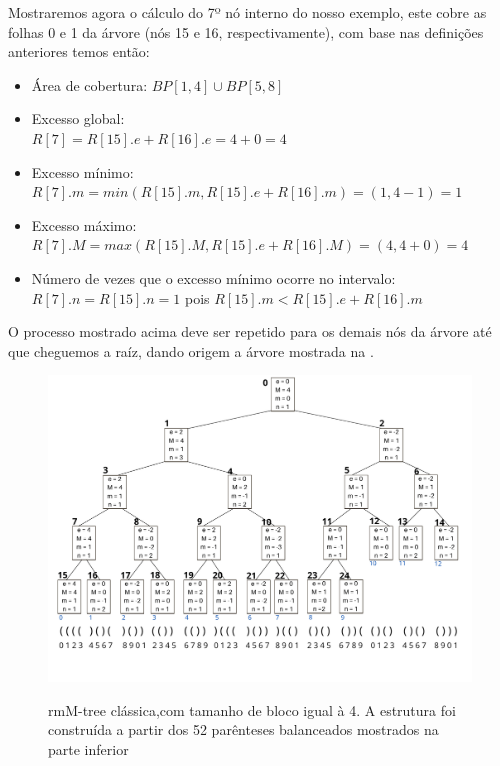 \begin{example}
    Mostraremos agora o cálculo do 7º nó interno do nosso exemplo, este cobre as folhas 0 e 1 da árvore (nós 15 e 16, respectivamente), com base nas definições anteriores temos então:
    \begin{itemize}
        \item Área de cobertura: $BP[1,4] \cup BP[5,8]$
        \item Excesso global: \\
        $R[7] = R[15].e + R[16].e = 4 + 0 = 4$
        \item Excesso mínimo:\\
        $R[7].m = min(R[15].m, R[15].e+R[16].m) = (1,4-1)=1$
        \item Excesso máximo:\\
        $R[7].M = max(R[15].M, R[15].e+R[16].M) = (4,4+0)=4$
        \item Número de vezes que o excesso mínimo ocorre no intervalo:\\
        $R[7].n = R[15].n = 1$ pois $R[15].m < R[15].e+R[16].m$
    \end{itemize}

    O processo mostrado acima deve ser repetido para os demais nós da árvore até que cheguemos a raíz, dando origem a árvore mostrada na . 
    \begin{figure}[!ht]
     \centering
      \caption[rmM-tree clássica.]{rmM-tree clássica,com tamanho de bloco igual à 4. A estrutura foi construída a partir dos 52 parênteses balanceados mostrados na parte inferior}
      \includegraphics[width=\columnwidth]{images/rmm-tree-bin.png}
      \label{fig:rmm-tree-binaria}
    \end{figure}
\end{example}

